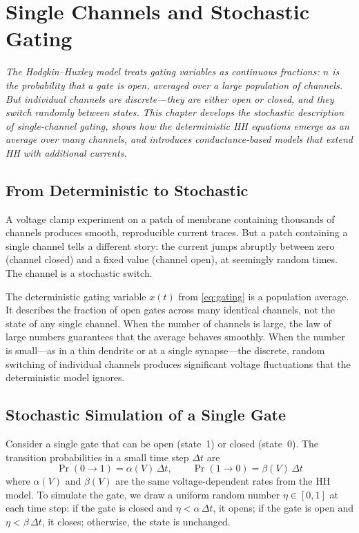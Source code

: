 \chapter{Single Channels and Stochastic Gating}
\label{ch:single-channels}

\textit{The Hodgkin--Huxley model treats gating variables as continuous fractions: $n$ is the probability that a gate is open, averaged over a large population of channels. But individual channels are discrete---they are either open or closed, and they switch randomly between states. This chapter develops the stochastic description of single-channel gating, shows how the deterministic HH equations emerge as an average over many channels, and introduces conductance-based models that extend HH with additional currents.}

\section{From Deterministic to Stochastic}
\label{sec:deterministic-to-stochastic}

A voltage clamp experiment on a patch of membrane containing thousands of channels produces smooth, reproducible current traces. But a patch containing a single channel tells a different story: the current jumps abruptly between zero (channel closed) and a fixed value (channel open), at seemingly random times. The channel is a stochastic switch.

The deterministic gating variable $x(t)$ from \cref{eq:gating} is a population average. It describes the fraction of open gates across many identical channels, not the state of any single channel. When the number of channels is large, the law of large numbers guarantees that the average behaves smoothly. When the number is small---as in a thin dendrite or at a single synapse---the discrete, random switching of individual channels produces significant voltage fluctuations that the deterministic model ignores.

\section{Stochastic Simulation of a Single Gate}
\label{sec:stochastic-gate}

Consider a single gate that can be open (state~1) or closed (state~0). The transition probabilities in a small time step $\Delta t$ are
%
\begin{equation}
  \Pr(0 \to 1) = \alpha(V)\,\Delta t, \qquad
  \Pr(1 \to 0) = \beta(V)\,\Delta t
  \label{eq:gate-transitions}
\end{equation}
%
where $\alpha(V)$ and $\beta(V)$ are the same voltage-dependent rates from the HH model. To simulate the gate, we draw a uniform random number $\eta \in [0, 1]$ at each time step: if the gate is closed and $\eta < \alpha\,\Delta t$, it opens; if the gate is open and $\eta < \beta\,\Delta t$, it closes; otherwise, the state is unchanged.

